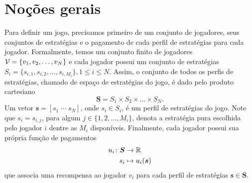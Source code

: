 

\section{Noções gerais}

Para definir um jogo, precisamos primeiro de um conjunto de jogadores, seus conjuntos de estratégias e o pagamento de cada perfil de estratégias para cada jogador. Formalmente, temos um conjunto finito de jogadores $\mathcal{V}=\{v_1,v_2,\dots,v_N\}$ e cada jogador possui um conjunto de estratégias $S_i=\{s_{i,1},s_{i,2},\dots,s_{i,M_i}\},1\leq i\leq N$. Assim, o conjunto de todos os perfis de estratégias, chamado de espaço de estratégias do jogo, é dado pelo produto cartesiano
\begin{equation}
\label{defS}
    \boldsymbol{S}=S_1\times S_2\times\dots\times S_N.
\end{equation}
Um vetor $\boldsymbol{s}=[ s_1 \; \cdots \; s_N]$, onde $s_i\in S_i$, é um perfil de estratégias do jogo. Note que $s_i=s_{i,j}$, para algum $j\in\{1,2,\dots,M_i\}$, denota a estratégia pura escolhida pelo jogador $i$ dentre as $M_i$ disponíveis. Finalmente, cada jogador possui sua própria função de pagamentos 
\begin{align}
\label{defU}
\begin{split}
    u_i \colon \boldsymbol{S} &\to \mathbb{R}\\
    s_i &\mapsto u_i(\boldsymbol{s})
\end{split}
\end{align}
que associa uma recompensa ao jogador $v_i$ para cada perfil de estratégias ${\boldsymbol{s}\in \boldsymbol{S}}$.

